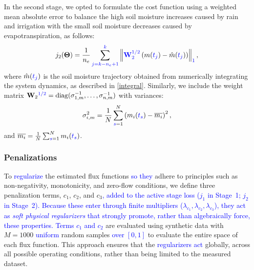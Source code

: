 \documentclass[pdflatex,sn-nature]{sn-jnl}%
\theoremstyle{thmstyleone}%
\theoremstyle{thmstyletwo}%
\theoremstyle{thmstylethree}%
\begin{document}
In the second stage, we opted to formulate the cost function using a weighted mean absolute error to balance the high soil moisture increases caused by rain and irrigation with the small soil moisture decreases caused by evapotranspiration, as follows:
\begin{equation}
    j_{2}(\boldsymbol{\Theta}) = 
    \frac{1}{n_e} \sum_{\textcolor{blue}{j = k - n_e + 1}}^{\textcolor{blue}{k}} 
    \left\| 
         \textcolor{blue}{\mathbf{W}_2^{1/2}}\left( 
            m(\textcolor{blue}{t_j}) - \hat{m}(\textcolor{blue}{t_j}) 
        \right) 
    \right\|_{\textcolor{blue}{1}},
    \label{eq:j2}
\end{equation}
where \( \hat{m}(\textcolor{blue}{t_j}) \) is the soil moisture trajectory obtained from numerically integrating the system dynamics, as described in \eqref{integral}.
Similarly, we include the weight matrix \( \mathbf{W}_2\textcolor{blue}{^{1/2}} = \operatorname{diag}(\sigma_{1,m}^{-1}, \dots, \sigma_{n,m}^{-1}) \) with variances:
\[
    \sigma_{i,m}^{2} = \frac{1}{N} \sum_{\textcolor{blue}{s}=1}^{N} \left( m_i(\textcolor{blue}{t_s}) - \overline{m_i} \right)^{2},
\]
and \( \overline{m_i} = \frac{1}{N} \sum_{\textcolor{blue}{s}=1}^{N} m_i(\textcolor{blue}{t_s}) \).

\subsubsection{Penalizations}
To \textcolor{blue}{regularize} the estimated flux functions \textcolor{blue}{so they} adhere to principles such as non-negativity, monotonicity, and zero-flow conditions, we define three penalization terms, \( c_1 \), \( c_2 \), and \( c_3 \)\textcolor{blue}{, added to the active stage loss ($j_1$ in Stage~1; $j_2$ in Stage~2). Because these enter through finite multipliers ($\lambda_{c_1}, \lambda_{c_2}, \lambda_{c_3}$), they act as \emph{soft physical regularizers} that strongly promote, rather than algebraically force, these properties.} \textcolor{blue}{Terms $c_1$ and $c_2$} are evaluated using synthetic data with \( M = 1000 \) \textcolor{blue}{uniform} random samples \textcolor{blue}{over $[0,1]$} to evaluate the entire space of each flux function. This approach ensures that the \textcolor{blue}{regularizers act} globally, across all possible operating conditions, rather than being limited to the measured dataset.
\end{document}
